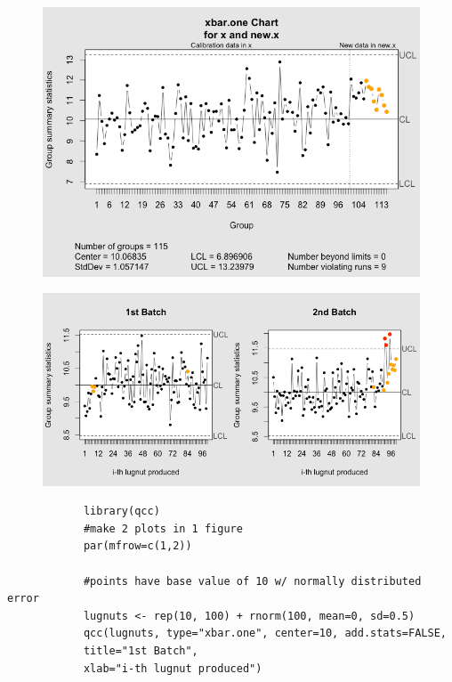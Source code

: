 \documentclass[]{report}
\begin{document}
		
		
		\begin{figure}[h!]
			\centering
			\includegraphics[width=0.9\linewidth]{./qcc-yhatexample}
			\caption{}
			\label{fig:qcc-yhatexample}
		\end{figure}
		\bigskip
		\newpage
		\begin{figure}[h!]
			\centering
			\includegraphics[width=0.90\linewidth]{./qcc_lugnuts1}
			
			\label{fig:qcc_lugnuts1}
		\end{figure}
		\begin{framed}
			\begin{verbatim}
			library(qcc)
			#make 2 plots in 1 figure
			par(mfrow=c(1,2))
			
			#points have base value of 10 w/ normally distributed error
			lugnuts <- rep(10, 100) + rnorm(100, mean=0, sd=0.5)
			qcc(lugnuts, type="xbar.one", center=10, add.stats=FALSE,
			title="1st Batch", 
			xlab="i-th lugnut produced")
			\end{verbatim}
		\end{framed} 
\end{document}
